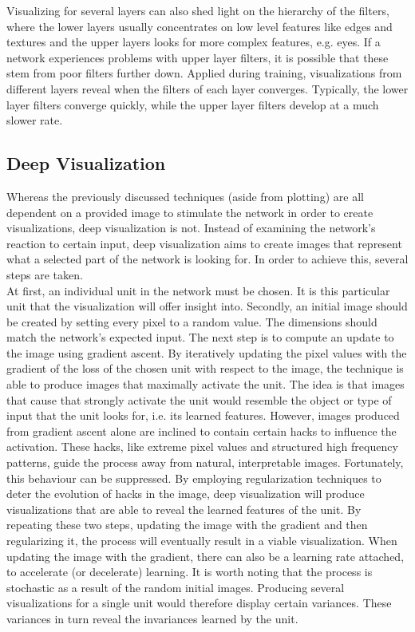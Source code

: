 \noindent Visualizing for several layers can also shed light on the hierarchy of the filters, where the lower layers usually concentrates on low level features like edges and textures and the upper layers looks for more complex features, e.g. eyes. If a network experiences problems with upper layer filters, it is possible that these stem from poor filters further down. Applied during training, visualizations from different layers reveal when the filters of each layer converges. Typically, the lower layer filters converge quickly, while the upper layer filters develop at a much slower rate.

\subsection{Deep Visualization} \label{sec:deep-vis}

Whereas the previously discussed techniques (aside from plotting) are all dependent on a provided image to stimulate the network in order to create visualizations, deep visualization is not. Instead of examining the network's reaction to certain input, deep visualization aims to create images that represent what a selected part of the network is looking for. In order to achieve this, several steps are taken. \\

\noindent At first, an individual unit in the network must be chosen. It is this particular unit that the visualization will offer insight into. Secondly, an initial image should be created by setting every pixel to a random value. The dimensions should match the network's expected input. The next step is to compute an update to the image using gradient ascent. By iteratively updating the pixel values with the gradient of the loss of the chosen unit with respect to the image, the technique is able to produce images that maximally activate the unit. The idea is that images that cause that strongly activate the unit would resemble the object or type of input that the unit looks for, i.e. its learned features. However, images produced from gradient ascent alone are inclined to contain certain hacks to influence the activation. These hacks, like extreme pixel values and structured high frequency patterns, guide the process away from natural, interpretable images. Fortunately, this behaviour can be suppressed. By employing regularization techniques to deter the evolution of hacks in the image, deep visualization will produce visualizations that are able to reveal the learned features of the unit. By repeating these two steps, updating the image with the gradient and then regularizing it, the process will eventually result in a viable visualization. When updating the image with the gradient, there can also be a learning rate attached, to accelerate (or decelerate) learning. It is worth noting that the process is stochastic as a result of the random initial images. Producing several visualizations for a single unit would therefore display certain variances. These variances in turn reveal the invariances learned by the unit. \\

